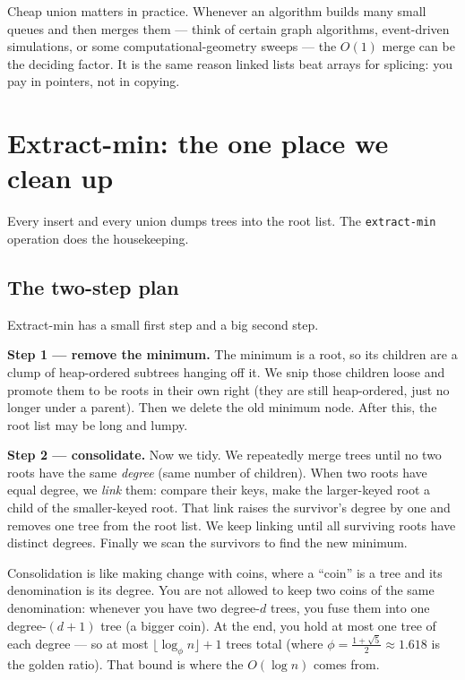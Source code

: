 \begin{aestheticbox}
Cheap union matters in practice. Whenever an algorithm builds many small queues
and then merges them --- think of certain graph algorithms, event-driven
simulations, or some computational-geometry sweeps --- the $O(1)$ merge can be the
deciding factor. It is the same reason linked lists beat arrays for splicing: you
pay in pointers, not in copying.
\end{aestheticbox}

\section{Extract-min: the one place we clean up}

Every insert and every union dumps trees into the root list.
The \lstinline|extract-min| operation does the housekeeping.

\subsection{The two-step plan}

Extract-min has a small first step and a big second step.

\textbf{Step 1 --- remove the minimum.} The minimum is a root, so its children are
a clump of heap-ordered subtrees hanging off it. We snip those children loose and
promote them to be roots in their own right (they are still heap-ordered, just no
longer under a parent). Then we delete the old minimum node. After this, the root
list may be long and lumpy.

\textbf{Step 2 --- consolidate.} Now we tidy. We repeatedly merge trees until no
two roots have the same \emph{degree} (same number of children). When two roots
have equal degree, we \emph{link} them: compare their keys, make the larger-keyed
root a child of the smaller-keyed root. That link raises the survivor's degree by
one and removes one tree from the root list. We keep linking until all surviving
roots have distinct degrees. Finally we scan the survivors to find the new
minimum.

\begin{intuitionbox}
Consolidation is like making change with coins, where a ``coin'' is a tree and its
denomination is its degree. You are not allowed to keep two coins of the same
denomination: whenever you have two degree-$d$ trees, you fuse them into one
degree-$(d{+}1)$ tree (a bigger coin). At the end, you hold at most one
tree of each degree --- so at most $\lfloor \log_\phi n\rfloor + 1$ trees total (where $\phi = \tfrac{1+\sqrt5}{2} \approx 1.618$ is the golden ratio).
That bound is where the $O(\log n)$ comes from.
\end{intuitionbox}

